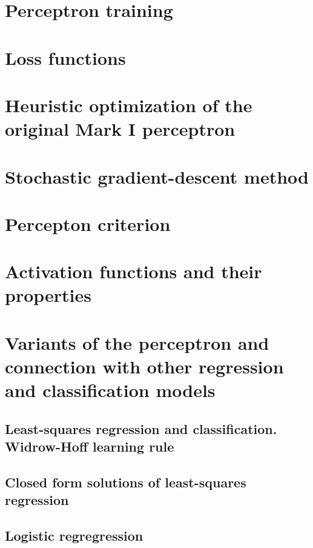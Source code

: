 \section{Perceptron training}


\section{Loss functions}

\section{Heuristic optimization of the original Mark I perceptron}

\section{Stochastic gradient-descent method}

\section{Percepton criterion}

\section{Activation functions and their properties}

\section{Variants of the perceptron and 
    connection with other regression and classification models}

\subsection{Least-squares regression and classification. Widrow-Hoff learning rule}

\subsection{Closed form solutions of least-squares regression}

\subsection{Logistic regregression}

